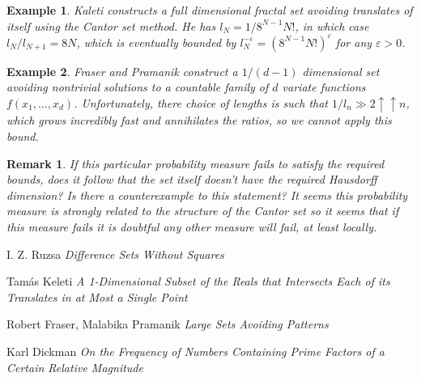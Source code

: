 \documentclass{report}
\theoremstyle{plain}
\newtheorem*{example}{Example}
\theoremstyle{plain}
\newtheorem*{remark}{Remark}
\begin{document}
\begin{example}
    Kaleti constructs a full dimensional fractal set avoiding translates of itself using the Cantor set method. He has $l_N = 1/8^{N-1}N!$, in which case $l_N/l_{N+1} = 8N$, which is eventually bounded by $l_N^{-\varepsilon} = (8^{N-1}N!)^\varepsilon$ for any $\varepsilon > 0$.
\end{example}

\begin{example}
    Fraser and Pramanik construct a $1/(d-1)$ dimensional set avoiding nontrivial solutions to a countable family of $d$ variate functions $f(x_1, \dots, x_d)$. Unfortunately, there choice of lengths is such that $1/l_n \gg 2 \uparrow \uparrow n$, which grows incredibly fast and annihilates the ratios, so we cannot apply this bound.
\end{example}

\begin{remark}
    If this particular probability measure fails to satisfy the required bounds, does it follow that the set itself doesn't have the required Hausdorff dimension? Is there a counterexample to this statement? It seems this probability measure is strongly related to the structure of the Cantor set so it seems that if this measure fails it is doubtful any other measure will fail, at least locally.
\end{remark}

\begin{thebibliography}{9}

I. Z. Ruzsa
\textit{Difference Sets Without Squares}

Tam\'{a}s Keleti
\textit{A 1-Dimensional Subset of the Reals that Intersects Each of its Translates in at Most a Single Point}

Robert Fraser, Malabika Pramanik
\textit{Large Sets Avoiding Patterns}

Karl Dickman
\textit{On the Frequency of Numbers Containing Prime Factors of a Certain Relative Magnitude}

\end{thebibliography}
\end{document}
